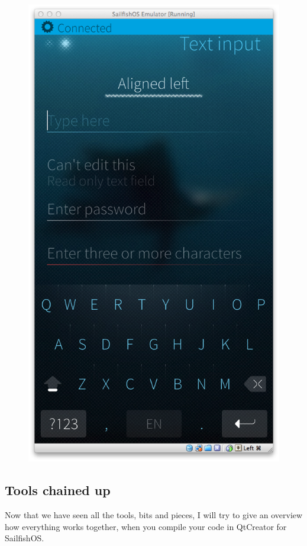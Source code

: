 \begin{figure}[H]
{  \includegraphics[scale=0.3]{../media/gfx/silica/silica10.png}
  \label{fig:silica10}
}
\end{figure}
%
%
\subsection{Tools chained up}\label{subset:toolschainedup}
%
Now that we have seen all the tools, bits and pieces, I will try to give an overview how everything works together, when you compile your code in QtCreator for SailfishOS.
%
%
